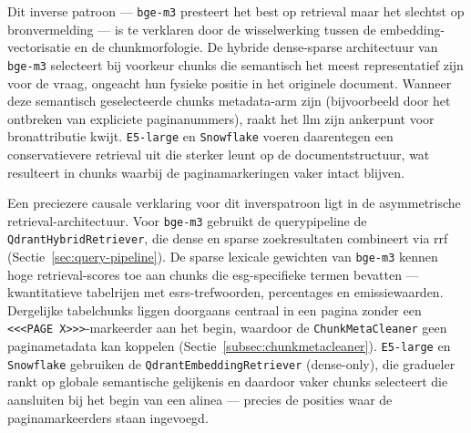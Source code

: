 Dit inverse patroon — \texttt{bge-m3} presteert het best op retrieval maar het slechtst op bronvermelding — is te verklaren door de wisselwerking tussen de embedding-vectorisatie en de chunkmorfologie. De hybride dense-sparse architectuur van \texttt{bge-m3} selecteert bij voorkeur chunks die semantisch het meest representatief zijn voor de vraag, ongeacht hun fysieke positie in het originele document. Wanneer deze semantisch geselecteerde chunks metadata-arm zijn (bijvoorbeeld door het ontbreken van expliciete paginanummers), raakt het \gls{llm} zijn ankerpunt voor bronattributie kwijt. \texttt{E5-large} en \texttt{Snowflake} voeren daarentegen een conservatievere retrieval uit die sterker leunt op de documentstructuur, wat resulteert in chunks waarbij de paginamarkeringen vaker intact blijven.

Een preciezere causale verklaring voor dit inverspatroon ligt in de asymmetrische retrieval-architectuur. Voor \texttt{bge-m3} gebruikt de querypipeline de \texttt{QdrantHybridRetriever}, die dense en sparse zoekresultaten combineert via \gls{rrf} (Sectie~\ref{sec:query-pipeline}). De sparse lexicale gewichten van \texttt{bge-m3} kennen hoge retrieval-scores toe aan chunks die \gls{esg}-specifieke termen bevatten — kwantitatieve tabelrijen met \gls{esrs}-trefwoorden, percentages en emissiewaarden. Dergelijke tabelchunks liggen doorgaans centraal in een pagina zonder een \texttt{<<<PAGE X>>>}-markeerder aan het begin, waardoor de \texttt{ChunkMetaCleaner} geen paginametadata kan koppelen (Sectie~\ref{subsec:chunkmetacleaner}). \texttt{E5-large} en \texttt{Snowflake} gebruiken de \texttt{QdrantEmbeddingRetriever} (dense-only), die gradueler rankt op globale semantische gelijkenis en daardoor vaker chunks selecteert die aansluiten bij het begin van een alinea — precies de posities waar de paginamarkeerders staan ingevoegd.

